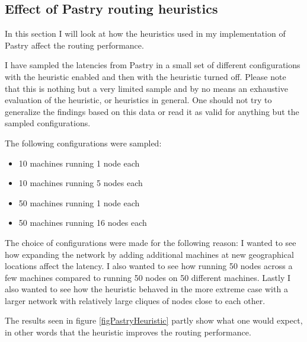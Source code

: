 
\subsection{Effect of Pastry routing heuristics}
In this section I will look at how the heuristics used in my implementation of Pastry affect the routing performance. 

I have sampled the latencies from Pastry in a small set of different configurations with the heuristic enabled and then with the heuristic turned off. Please note that this is nothing but a very limited sample and by no means an exhaustive evaluation of the heuristic, or heuristics in general. One should not try to generalize the findings based on this data or read it as valid for anything but the sampled configurations.

The following configurations were sampled:
\begin{itemize}
\item 10 machines running 1 node each
\item 10 machines running 5 nodes each
\item 50 machines running 1 node each
\item 50 machines running 16 nodes each
\end{itemize}

The choice of configurations were made for the following reason:
I wanted to see how expanding the network by adding additional machines at new geographical locations affect the latency.
I also wanted to see how running 50 nodes across a few machines compared to running 50 nodes on 50 different machines. Lastly I also wanted to see how the heuristic behaved in the more extreme case with a larger network with relatively large cliques of nodes close to each other.

The results seen in figure \ref{figPastryHeuristic} partly show what one would expect, in other words that the heuristic improves the routing performance.

